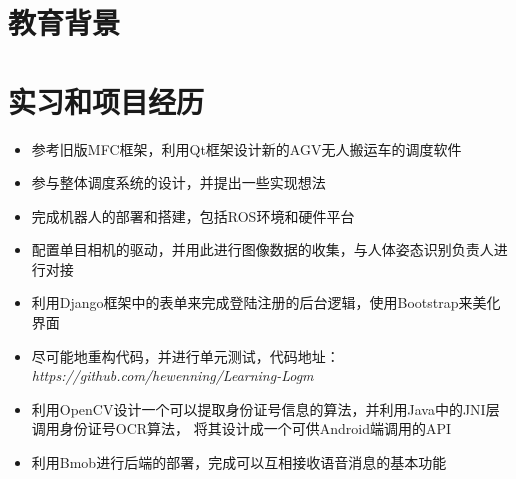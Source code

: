 \documentclass{resume}
\begin{document}



\section{教育背景}



\section{实习和项目经历}
\begin{itemize}
  \item 参考旧版MFC框架，利用Qt框架设计新的AGV无人搬运车的调度软件
  \item 参与整体调度系统的设计，并提出一些实现想法
\end{itemize}


\begin{itemize}
  \item 完成机器人的部署和搭建，包括ROS环境和硬件平台
  \item 配置单目相机的驱动，并用此进行图像数据的收集，与人体姿态识别负责人进行对接
\end{itemize}

\begin{itemize}
	\item 利用Django框架中的表单来完成登陆注册的后台逻辑，使用Bootstrap来美化界面
	\item 尽可能地重构代码，并进行单元测试，代码地址：\textit{https://github.com/hewenning/Learning-Logm}
\end{itemize}

\begin{itemize}
  \item 利用OpenCV设计一个可以提取身份证号信息的算法，并利用Java中的JNI层调用身份证号OCR算法，
  将其设计成一个可供Android端调用的API
  \item 利用Bmob进行后端的部署，完成可以互相接收语音消息的基本功能
\end{itemize}
\end{document}
